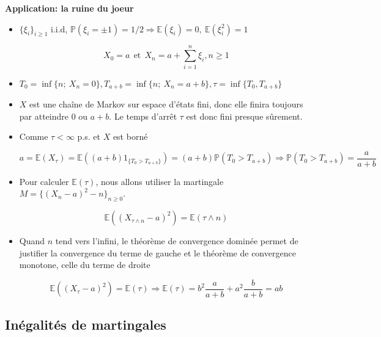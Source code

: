 \documentclass[10pt,a4paper,oneside]{article}
\begin{document}
\textbf{Application: la ruine du joeur}

\begin{itemize}
\item
$\{ \xi_i \}_{i \geq 1}$ i.i.d, $\mathbb{P}(\xi_i = \pm 1) = 1 / 2 \Rightarrow \mathbb{E}(\xi_i) = 0,\ \mathbb{E}(\xi_i^2) = 1$

\[ X_0 = a\ \ \text{et}\ \ X_n = a + \sum_{i = 1}^n\xi_i, n \geq 1 \]

\item
$T_0 = \inf \{ n;\ X_n = 0 \}, T_{a + b} = \inf \{ n;\ X_n = a + b \}, \tau = \inf \{ T_0, T_{a + b} \}$

\item
$X$ est une chaîne de Markov sur espace d'états fini, donc elle finira toujours par atteindre 0 ou $a + b$. Le temps d'arrêt $\tau$ est donc fini presque sûrement.

\item
Comme $\tau < \infty$ p.s. et $X$ est borné

\[ a = \mathbb{E}(X_\tau) = \mathbb{E}((a + b)1_{\{ T_0 > T_{a + b} \}}) = (a + b) \mathbb{P}(T_0 > T_{a + b}) \Rightarrow \mathbb{P}(T_0 > T_{a + b}) = \frac{a}{a + b} \]

\item
Pour calculer $\mathbb{E}(\tau)$, nous allons utiliser la martingale $M = \{ (X_n - a)^2 - n \}_{n \geq 0}$.

\[ \mathbb{E}((X_{\tau \wedge n} - a)^2) = \mathbb{E}(\tau \wedge n) \]

\item
Quand $n$ tend vers l'infini, le théorème de convergence dominée permet de justifier la convergence du terme de gauche et le théorème de convergence monotone, celle du terme de droite

\[ \mathbb{E}((X_\tau - a)^2) = \mathbb{E}(\tau) \Rightarrow \mathbb{E}(\tau) = b^2 \frac{a}{a + b} + a^2 \frac{b}{a + b} = ab \]
\end{itemize}

\subsection{Inégalités de martingales}
\end{document}
